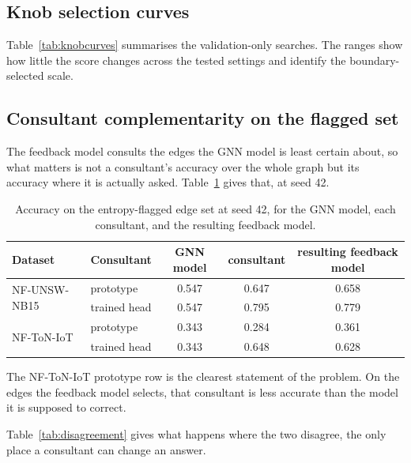 

\FloatBarrier
\subsection{Knob selection curves}
\label{app:knobs}

Table~\ref{tab:knobcurves} summarises the validation-only searches. The ranges show how little the score changes across the tested settings and identify the boundary-selected scale.



\FloatBarrier
\subsection{Consultant complementarity on the flagged set}
\label{app:complementarity}

The feedback model consults the edges the GNN model is least certain about, so what matters is not a
consultant's accuracy over the whole graph but its accuracy where it is actually asked.
Table~\ref{tab:complementarity} gives that, at seed 42.

\begin{table}[htbp]
\centering
\caption[Consultant accuracy on uncertain edges]{Accuracy on the entropy-flagged edge set at seed 42, for the GNN model, each
consultant, and the resulting feedback model.}
\label{tab:complementarity}
\small
\begin{tabular}{llccc}
\toprule
Dataset & Consultant & GNN model & consultant & resulting feedback model \\
\midrule
\multirow{2}{*}{NF-UNSW-NB15}
 & prototype    & 0.547 & 0.647 & 0.658 \\
 & trained head & 0.547 & 0.795 & 0.779 \\
\midrule
\multirow{2}{*}{NF-ToN-IoT}
 & prototype    & 0.343 & 0.284 & 0.361 \\
 & trained head & 0.343 & 0.648 & 0.628 \\
\bottomrule
\end{tabular}
\end{table}

The NF-ToN-IoT prototype row is the clearest statement of the problem. On the edges the feedback model
selects, that consultant is less accurate than the model it is supposed to correct.

Table~\ref{tab:disagreement} gives what happens where the two disagree, the only
place a consultant can change an answer.

